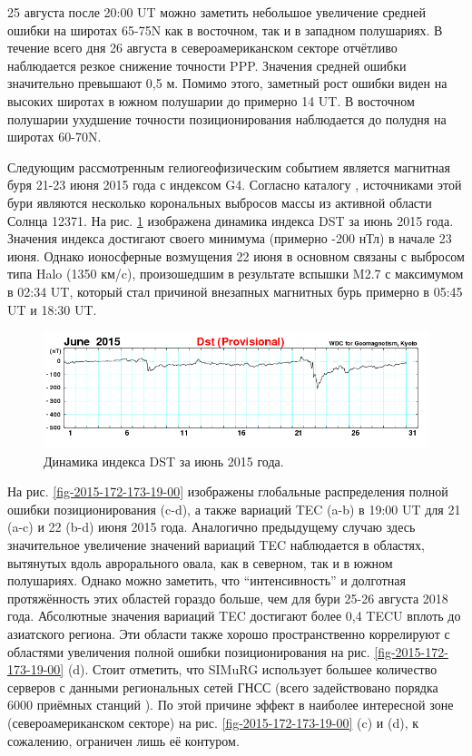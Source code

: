 25 августа после 20:00 UT можно заметить небольшое увеличение средней ошибки на широтах 65-75\degree N как в восточном, так и в западном полушариях. 
В течение всего дня 26 августа в североамериканском секторе отчётливо наблюдается резкое снижение точности PPP.
Значения средней ошибки значительно превышают 0,5 м.
Помимо этого, заметный рост ошибки виден на высоких широтах в южном полушарии до примерно 14 UT.
В восточном полушарии ухудшение точности позиционирования наблюдается до полудня на широтах 60-70\degree N.

Следующим рассмотренным гелиогеофизическим событием является магнитная буря 21-23 июня 2015 года с индексом G4.
Согласно каталогу \cite{SOHO}, источниками этой бури являются несколько корональных выбросов массы из активной области Солнца 12371.
На рис. \ref{fig-dst1506} изображена динамика индекса DST за июнь 2015 года.
Значения индекса достигают своего минимума (примерно -200 нТл) в начале 23 июня.
Однако ионосферные возмущения 22 июня в основном связаны с выбросом типа Halo (1350 км/c), произошедшим в результате вспышки M2.7 с максимумом в 02:34 UT, который стал причиной внезапных магнитных бурь примерно в 05:45 UT и 18:30 UT.
\begin{figure}[h]
\includegraphics[width=\textwidth]{fig/dst1506.png}    
\caption{Динамика индекса DST за июнь 2015 года.}
\label{fig-dst1506}      
\end{figure} 

На рис. \ref{fig-2015-172-173-19-00} изображены глобальные распределения полной ошибки позиционирования (c-d), а также вариаций TEC (a-b) в 19:00 UT для 21 (a-c) и 22 (b-d) июня 2015 года. 
Аналогично предыдущему случаю здесь значительное увеличение значений вариаций TEC наблюдается в областях, вытянутых вдоль аврорального овала, как в северном, так и в южном полушариях. 
Однако можно заметить, что ``интенсивность'' и долготная протяжённость этих областей гораздо больше, чем для бури 25-26 августа 2018 года.
Абсолютные значения вариаций TEC достигают более 0,4 TECU вплоть до азиатского региона. 
Эти области также хорошо пространственно коррелируют с областями увеличения полной ошибки позиционирования на рис. \ref{fig-2015-172-173-19-00} (d). 
Стоит отметить, что SIMuRG использует большее количество серверов с данными региональных сетей ГНСС (всего задействовано порядка 6000 приёмных станций \cite{Yasyukevich2020}).
По этой причине эффект в наиболее интересной зоне (североамериканском секторе) на рис. \ref{fig-2015-172-173-19-00} (c) и (d), к сожалению, ограничен лишь её контуром.  

